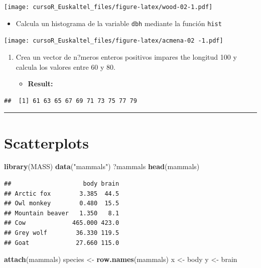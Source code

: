 \documentclass[]{book}
\newenvironment{Shaded}{\begin{snugshade}}{\end{snugshade}}
\newcommand{\KeywordTok}[1]{\textcolor[rgb]{0.13,0.29,0.53}{\textbf{#1}}}
\newcommand{\StringTok}[1]{\textcolor[rgb]{0.31,0.60,0.02}{#1}}
\newcommand{\NormalTok}[1]{#1}
\providecommand{\tightlist}{%
  \setlength{\itemsep}{0pt}\setlength{\parskip}{0pt}}
\begin{document}
\texttt{[image: cursoR\_Euskaltel\_files/figure-latex/wood-02-1.pdf]}

\begin{itemize}
\tightlist
\item
  Calcula un histograma de la variable \texttt{dbh} mediante la función
  \texttt{hist}
\end{itemize}

\texttt{[image: cursoR\_Euskaltel\_files/figure-latex/acmena-02 -1.pdf]}

\begin{enumerate}
\def\labelenumi{\arabic{enumi}.}
\setcounter{enumi}{3}
\item
  Crea un vector de n?meros enteros positivos impares the longitud 100 y
  calcula los valores entre 60 y 80.

  \begin{itemize}
  \tightlist
  \item
    \textbf{Result:}
  \end{itemize}
\end{enumerate}

\begin{verbatim}
##  [1] 61 63 65 67 69 71 73 75 77 79
\end{verbatim}

\begin{center}\rule{0.5\linewidth}{\linethickness}\end{center}

\section{Scatterplots}\label{scatterplots}

\begin{Shaded}
\begin{Highlighting}[]
\KeywordTok{library}\NormalTok{(MASS)}
\KeywordTok{data}\NormalTok{(}\StringTok{"mammals"}\NormalTok{)}
\NormalTok{?mammals}
\KeywordTok{head}\NormalTok{(mammals)}
\end{Highlighting}
\end{Shaded}

\begin{verbatim}
##                    body brain
## Arctic fox        3.385  44.5
## Owl monkey        0.480  15.5
## Mountain beaver   1.350   8.1
## Cow             465.000 423.0
## Grey wolf        36.330 119.5
## Goat             27.660 115.0
\end{verbatim}

\begin{Shaded}
\begin{Highlighting}[]
\KeywordTok{attach}\NormalTok{(mammals)}
\NormalTok{species <-}\StringTok{ }\KeywordTok{row.names}\NormalTok{(mammals)}
\NormalTok{x <-}\StringTok{ }\NormalTok{body}
\NormalTok{y <-}\StringTok{ }\NormalTok{brain}
\end{Highlighting}
\end{Shaded}
\end{document}
